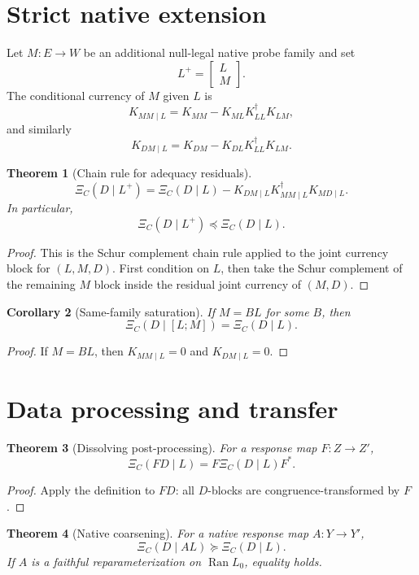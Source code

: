 \documentclass[11pt]{article}
\newtheorem{theorem}{Theorem}[section]
\newtheorem{corollary}[theorem]{Corollary}
\newcommand{\Ran}{\operatorname{Ran}}
\begin{document}
\section{Strict native extension}

Let $M:E\to W$ be an additional null-legal native probe family and set
\[
L^+=\begin{bmatrix}L\\M\end{bmatrix}.
\]
The conditional currency of $M$ given $L$ is
\[
K_{MM\mid L}=K_{MM}-K_{ML}K_{LL}^\dagger K_{LM},
\]
and similarly
\[
K_{DM\mid L}=K_{DM}-K_{DL}K_{LL}^\dagger K_{LM}.
\]

\begin{theorem}[Chain rule for adequacy residuals]
\[
\boxed{\Xi_C(D\mid L^+)=\Xi_C(D\mid L)-K_{DM\mid L}K_{MM\mid L}^\dagger K_{MD\mid L}.}
\]
In particular,
\[
\Xi_C(D\mid L^+)\preceq \Xi_C(D\mid L).
\]
\end{theorem}

\begin{proof}
This is the Schur complement chain rule applied to the joint currency block for $(L,M,D)$.  First condition on $L$, then take the Schur complement of the remaining $M$ block inside the residual joint currency of $(M,D)$.
\end{proof}

\begin{corollary}[Same-family saturation]
If $M=BL$ for some $B$, then
\[
\Xi_C(D\mid[L;M])=\Xi_C(D\mid L).
\]
\end{corollary}

\begin{proof}
If $M=BL$, then $K_{MM\mid L}=0$ and $K_{DM\mid L}=0$.
\end{proof}

\section{Data processing and transfer}

\begin{theorem}[Dissolving post-processing]
For a response map $F:Z\to Z'$,
\[
\boxed{\Xi_C(FD\mid L)=F\Xi_C(D\mid L)F^*.}
\]
\end{theorem}

\begin{proof}
Apply the definition to $FD$: all $D$-blocks are congruence-transformed by $F$.
\end{proof}

\begin{theorem}[Native coarsening]
For a native response map $A:Y\to Y'$,
\[
\boxed{\Xi_C(D\mid AL)\succeq \Xi_C(D\mid L).}
\]
If $A$ is a faithful reparameterization on $\Ran L_0$, equality holds.
\end{theorem}
\end{document}

